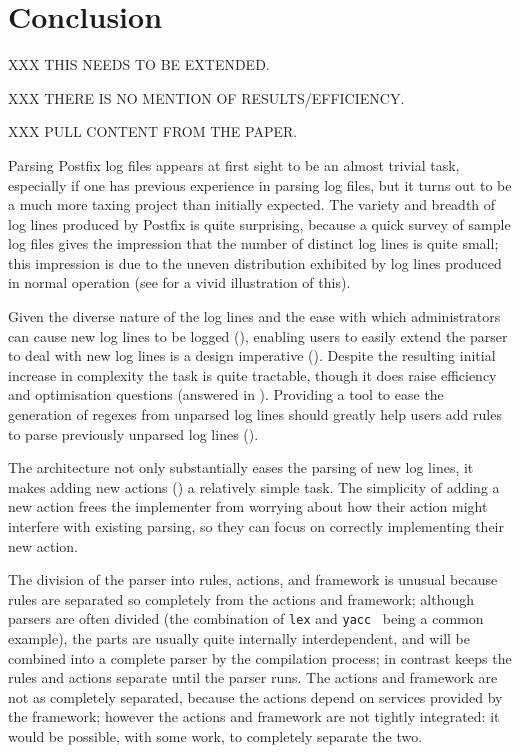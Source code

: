 \chapter{Conclusion}

\label{conclusion}

XXX THIS NEEDS TO BE EXTENDED\@.

XXX THERE IS NO MENTION OF RESULTS/EFFICIENCY\@.

XXX PULL CONTENT FROM THE PAPER\@.

Parsing Postfix log files appears at first sight to be an almost trivial
task, especially if one has previous experience in parsing log files, but
it turns out to be a much more taxing project than initially expected.  The
variety and breadth of log lines produced by Postfix is quite surprising,
because a quick survey of sample log files gives the impression that the
number of distinct log lines is quite small; this impression is due to the
uneven distribution exhibited by log lines produced in normal operation
(see  for a vivid illustration of this).


Given the diverse nature of the log lines and the ease with which
administrators can cause new log lines to be logged (), enabling users to easily extend the parser to deal with new
log lines is a design imperative ().  Despite the
resulting initial increase in complexity the task is quite tractable,
though it does raise efficiency and optimisation questions (answered in
).  Providing a tool to ease the generation
of regexes from unparsed log lines should greatly help users add rules
to parse previously unparsed log lines ().


The architecture not only substantially eases the parsing of new log lines,
it makes adding new actions () a relatively simple task.  The simplicity of adding a new
action frees the implementer from worrying about how their action might
interfere with existing parsing, so they can focus on correctly
implementing their new action.


The division of the parser into rules, actions, and framework is unusual
because rules are separated so completely from the actions and framework;
although parsers are often divided (the combination of \texttt{lex} and
\texttt{yacc}~\cite{lex-and-yacc-book} being a common example), the parts
are usually quite internally interdependent, and will be combined into a
complete parser by the compilation process; in contrast \parsername{} keeps
the rules and actions separate until the parser runs.  The actions and
framework are not as completely separated, because the actions depend on
services provided by the framework; however the actions and framework are
not tightly integrated: it would be possible, with some work, to completely
separate the two.

